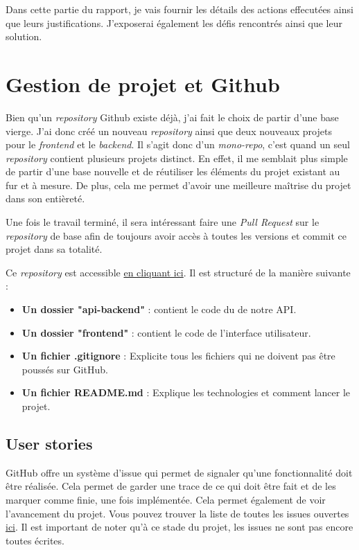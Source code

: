 Dans cette partie du rapport, je vais fournir les détails des actions effecutées ainsi que leurs justifications. J'exposerai également les défis rencontrés ainsi que leur solution.
\section{Gestion de projet et Github}
Bien qu'un \emph{repository} Github existe déjà, j'ai fait le choix de partir d'une base vierge. J'ai donc créé un nouveau \emph{repository} ainsi que deux nouveaux projets pour le \emph{frontend} et le \emph{backend}. Il s'agit donc d'un \emph{mono-repo}, c'est quand un seul \emph{repository} contient plusieurs projets distinct. En effet, il me semblait plus simple de partir d'une base nouvelle et de réutiliser les éléments du projet existant au fur et à mesure. De plus, cela me permet d'avoir une meilleure maîtrise du projet dans son entièreté.

Une fois le travail terminé, il sera intéressant faire une \emph{Pull Request} sur le \emph{repository} de base afin de toujours avoir accès à toutes les versions et commit ce projet dans sa totalité.

Ce \emph{repository} est accessible \href{https://github.com/Marinlestylo/h-quiz}{en cliquant ici}. Il est structuré de la manière suivante :
\begin{itemize}
    \item \textbf{Un dossier "api-backend"} : contient le code du de notre API.
    \item \textbf{Un dossier "frontend"} : contient le code de l'interface utilisateur.
    \item \textbf{Un fichier .gitignore} : Explicite tous les fichiers qui ne doivent pas être poussés sur GitHub.
    \item \textbf{Un fichier README.md} : Explique les technologies et comment lancer le projet.
\end{itemize}

\subsection{User stories}
GitHub offre un système d'issue qui permet de signaler qu'une fonctionnalité doit être réalisée. Cela permet de garder une trace de ce qui doit être fait et de les marquer comme finie, une fois implémentée. Cela permet également de voir l'avancement du projet. Vous pouvez trouver la liste de toutes les issues ouvertes \href{https://github.com/Marinlestylo/h-quiz/issues}{ici}. Il est important de noter qu'à ce stade du projet, les issues ne sont pas encore toutes écrites.

